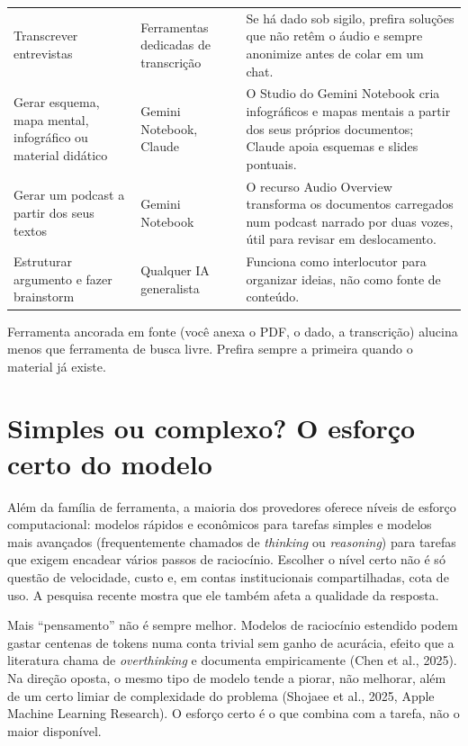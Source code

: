 \documentclass[11pt,a4paper]{article}
\begin{document}
\begin{center}
\begin{tabular}{@{}p{3.2cm}p{3.1cm}p{8cm}@{}}
Transcrever entrevistas & Ferramentas dedicadas de transcrição & Se há dado sob sigilo, prefira soluções que não retêm o áudio e sempre anonimize antes de colar em um chat. \\
Gerar esquema, mapa mental, infográfico ou material didático & Gemini Notebook, Claude & O Studio do Gemini Notebook cria infográficos e mapas mentais a partir dos seus próprios documentos; Claude apoia esquemas e slides pontuais. \\
\rowcolor{azulUNIsuave!45}
Gerar um podcast a partir dos seus textos & Gemini Notebook & O recurso Audio Overview transforma os documentos carregados num podcast narrado por duas vozes, útil para revisar em deslocamento. \\
Estruturar argumento e fazer brainstorm & Qualquer IA generalista & Funciona como interlocutor para organizar ideias, não como fonte de conteúdo. \\
\end{tabular}
\end{center}
\begin{dica}
Ferramenta ancorada em fonte (você anexa o PDF, o dado, a transcrição) alucina menos que ferramenta de busca livre. Prefira sempre a primeira quando o material já existe.
\end{dica}

\section{Simples ou complexo? O esforço certo do modelo}
\small
Além da família de ferramenta, a maioria dos provedores oferece níveis de esforço computacional: modelos rápidos e econômicos para tarefas simples e modelos mais avançados (frequentemente chamados de \textit{thinking} ou \textit{reasoning}) para tarefas que exigem encadear vários passos de raciocínio. Escolher o nível certo não é só questão de velocidade, custo e, em contas institucionais compartilhadas, cota de uso. A pesquisa recente mostra que ele também afeta a qualidade da resposta.

\begin{atencao}
Mais ``pensamento'' não é sempre melhor. Modelos de raciocínio estendido podem gastar centenas de tokens numa conta trivial sem ganho de acurácia, efeito que a literatura chama de \textit{overthinking} e documenta empiricamente (Chen et al., 2025). Na direção oposta, o mesmo tipo de modelo tende a piorar, não melhorar, além de um certo limiar de complexidade do problema (Shojaee et al., 2025, Apple Machine Learning Research). O esforço certo é o que combina com a tarefa, não o maior disponível.
\end{atencao}
\end{document}
